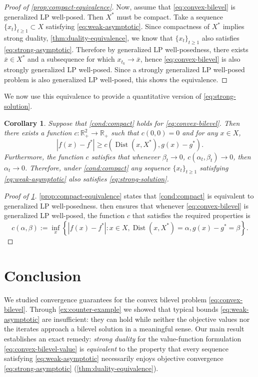 \documentclass[11pt,oneside]{article}
\theoremstyle{plain}
\newtheorem{corollary}{Corollary}
\theoremstyle{plain}
\theoremstyle{plain}%
\DeclareMathOperator{\Dist}{Dist}
\def\bbR{{\mathbb{R}}}
\begin{document}
{\begin{proof}[Proof of \cref{prop:compact-equivalence}]
Now, assume that \cref{eq:convex-bilevel} is generalized LP well-posed. Then $X^*$ must be compact. Take a sequence $\{x_t\}_{t \geq 1} \subset X$ satisfying \cref{eq:weak-asymptotic}. Since compactness of $X^*$ implies strong duality, \cref{thm:duality-equivalence}, we know that $\{x_t\}_{t \geq 1}$ also satisfies \cref{eq:strong-asymptotic}. Therefore by generalized LP well-posedness, there exists $\bar{x} \in X^*$ and a subsequence for which $x_{t_k} \to \bar{x}$, hence \cref{eq:convex-bilevel} is also strongly generalized LP well-posed. Since a strongly generalized LP well-posed problem is also generalized LP well-posed, this shows the equivalence.
\end{proof}

We now use this equivalence to provide a quantitative version of \cref{eq:strong-solution}.


\begin{corollary}\label{cor:quantified}
Suppose that \cref{cond:compact} holds for \cref{eq:convex-bilevel}. Then there exists a function $c:\bbR_+^2 \to \bbR_+$ such that $c(0,0) = 0$ and for any $x \in X$,
\[ |f(x) - f^*| \geq c\left( \Dist(x,X^*), g(x) - g^* \right). \]
Furthermore, the function $c$ satisfies that whenever $\beta_t \to 0$, $c(\alpha_t,\beta_t) \to 0$, then $\alpha_t \to 0$. Therefore, under \cref{cond:compact} any sequence $\{x_t\}_{t \geq 1}$ satisfying \cref{eq:weak-asymptotic} also satisfies \cref{eq:strong-solution}.
\end{corollary}
\begin{proof}[Proof of \cref{cor:quantified}]
\cref{prop:compact-equivalence} states that \cref{cond:compact} is equivalent to generalized LP well-posedness. \citet[Theorem 2.2]{HuangYang2006} then ensures that whenever \cref{eq:convex-bilevel} is generalized LP well-posed, the function $c$ that satisfies the required properties is
\[ c(\alpha,\beta) := \inf_x \left\{ |f(x) - f^*| : x \in X, \Dist(x,X^*) = \alpha, g(x) - g^* = \beta \right\}. \]
\end{proof}

\section{Conclusion}\label{sec:conclusion}

We studied convergence guarantees for the convex bilevel problem \eqref{eq:convex-bilevel}. Through \cref{ex:counter-example} we showed that typical bounds \eqref{eq:weak-asymptotic} are insufficient: they can hold while neither the objective values nor the iterates approach a bilevel solution in a meaningful sense. Our main result establishes an exact remedy: \emph{strong duality} for the value-function formulation \eqref{eq:convex-bilevel-value} is \emph{equivalent} to the property that every sequence satisfying \eqref{eq:weak-asymptotic} necessarily enjoys objective convergence \eqref{eq:strong-asymptotic} (\cref{thm:duality-equivalence}).

}
\end{document}
